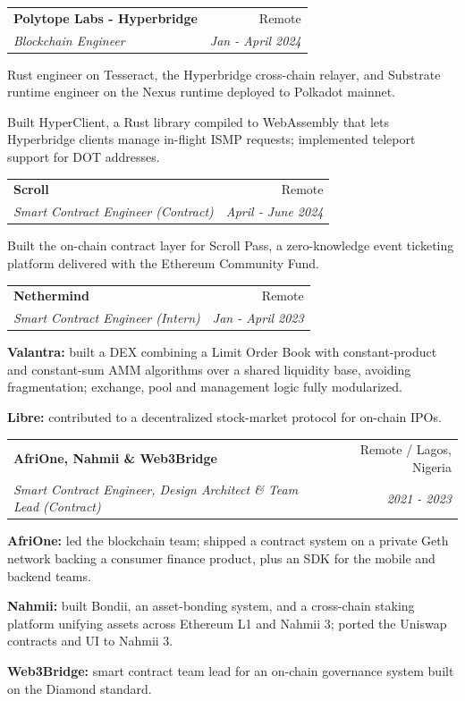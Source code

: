\documentclass[11pt,a4paper]{article}
\makeatletter
\newcommand{\cventry}[4]{%
  \begin{tabular*}{\linewidth}[t]{@{\extracolsep{\fill}}l r@{}}
    \textbf{#1} & #2 \\
    \textit{#3} & \textit{#4}
  \end{tabular*}%
}
\makeatother
\begin{document}
\begin{cventries}
\item \cventry{Polytope Labs - Hyperbridge}{Remote}
              {Blockchain Engineer}{Jan - April 2024}
\begin{cvbullets}
  \item Rust engineer on Tesseract, the Hyperbridge cross-chain relayer, and Substrate runtime engineer
        on the Nexus runtime deployed to Polkadot mainnet.
  \item Built HyperClient, a Rust library compiled to WebAssembly that lets Hyperbridge clients manage
        in-flight ISMP requests; implemented teleport support for DOT addresses.
\end{cvbullets}

\item \cventry{Scroll}{Remote}
              {Smart Contract Engineer (Contract)}{April - June 2024}
\begin{cvbullets}
  \item Built the on-chain contract layer for Scroll Pass, a zero-knowledge event ticketing platform
        delivered with the Ethereum Community Fund.
\end{cvbullets}

\item \cventry{Nethermind}{Remote}
              {Smart Contract Engineer (Intern)}{Jan - April 2023}
\begin{cvbullets}
  \item \textbf{Valantra:} built a DEX combining a Limit Order Book with constant-product and
        constant-sum AMM algorithms over a shared liquidity base, avoiding fragmentation; exchange, pool
        and management logic fully modularized.
  \item \textbf{Libre:} contributed to a decentralized stock-market protocol for on-chain IPOs.
\end{cvbullets}

\item \cventry{AfriOne, Nahmii \& Web3Bridge}{Remote / Lagos, Nigeria}
              {Smart Contract Engineer, Design Architect \& Team Lead (Contract)}{2021 - 2023}
\begin{cvbullets}
  \item \textbf{AfriOne:} led the blockchain team; shipped a contract system on a private Geth network
        backing a consumer finance product, plus an SDK for the mobile and backend teams.
  \item \textbf{Nahmii:} built Bondii, an asset-bonding system, and a cross-chain staking platform
        unifying assets across Ethereum L1 and Nahmii 3; ported the Uniswap contracts and UI to Nahmii 3.
  \item \textbf{Web3Bridge:} smart contract team lead for an on-chain governance system built on the Diamond standard.
\end{cvbullets}

\end{cventries}
\end{document}
